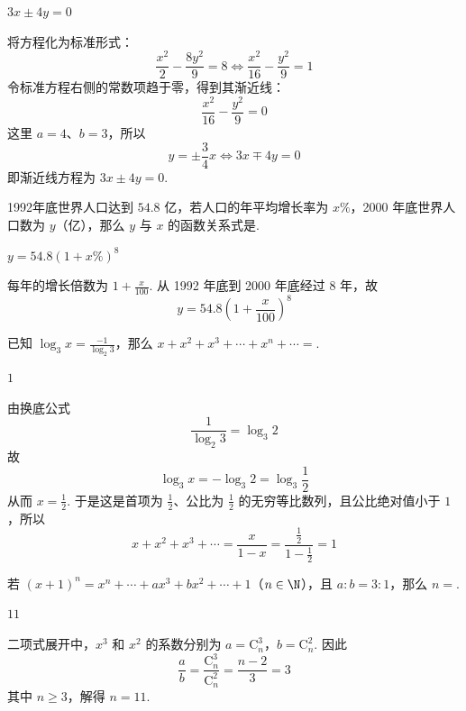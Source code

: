 \documentclass[UTF8,a4paper,oneside,11pt]{ctexbook}
\begin{document}
\begin{answer}
\(3x\pm4y=0\)
\end{answer}

\begin{solution}
将方程化为标准形式：
\[
\frac{x^2}{2}-\frac{8y^2}{9}=8
\iff \frac{x^2}{16}-\frac{y^2}{9}=1
\]
令标准方程右侧的常数项趋于零，得到其渐近线：
\[
\frac{x^2}{16}-\frac{y^2}{9}=0
\]
这里 \(a=4\)、\(b=3\)，所以
\[
y=\pm\frac{3}{4}x\iff 3x\mp4y=0
\]
即渐近线方程为 \(3x\pm4y=0\).
\end{solution}

\begin{problem}
1992年底世界人口达到 \(54.8\text{ 亿}\)，若人口的年平均增长率为 \(x\%\)，2000 年底世界人口数为 \(y\)（亿），那么 \(y\) 与 \(x\) 的函数关系式是\fillinblank{}.
\end{problem}

\begin{answer}
\(y=54.8(1+x\%)^8\)
\end{answer}

\begin{solution}
每年的增长倍数为 \(1+\frac{x}{100}\). 从 1992 年底到 2000 年底经过 \(8\) 年，故
\[
y=54.8\left(1+\frac{x}{100}\right)^8
\]
\end{solution}

\begin{problem}
已知 \(\log_3 x=\frac{-1}{\log_2 3}\)，那么 \(x+x^2+x^3+\cdots+x^n+\cdots=\)\fillinblank{}.
\end{problem}

\begin{answer}
\(1\)
\end{answer}

\begin{solution}
由换底公式
\[
\frac{1}{\log_2 3}=\log_3 2
\]
故
\[
\log_3x=-\log_3 2=\log_3\frac12
\]
从而 \(x=\frac12\). 于是这是首项为 \(\frac12\)、公比为 \(\frac12\) 的无穷等比数列，且公比绝对值小于 \(1\)，所以
\[
x+x^2+x^3+\cdots=\frac{x}{1-x}=\frac{\frac{1}{2}}{1-\frac{1}{2}}=1
\]
\end{solution}

\begin{problem}
若 \((x+1)^n=x^n+\cdots+ax^3+bx^2+\cdots+1\)（\(n\in\N\)），且 \(a:b=3:1\)，那么 \(n=\)\fillinblank{}.
\end{problem}

\begin{answer}
\(11\)
\end{answer}

\begin{solution}
二项式展开中，\(x^3\) 和 \(x^2\) 的系数分别为
\(a=\mathrm C_n^3\)，\(b=\mathrm C_n^2\).
因此
\[
\frac{a}{b}=\frac{\mathrm C_n^3}{\mathrm C_n^2}=\frac{n-2}{3}=3
\]
其中 \(n\geqslant3\)，解得 \(n=11\).
\end{solution}
\end{document}
